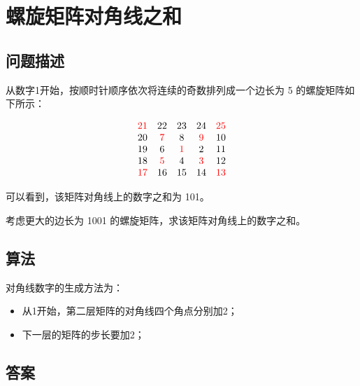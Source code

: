 \section{螺旋矩阵对角线之和}
\subsection{问题描述}
\begin{tcolorbox}

	从数字1开始，按顺时针顺序依次将连续的奇数排列成一个边长为 5 的螺旋矩阵如下所示：

	\[
		\begin{matrix}
			\textcolor{red}{21} & 22      & 23      & 24      & \textcolor{red}{25} \\
			20       & \textcolor{red}{7} & 8       & \textcolor{red}{9} & 10       \\
			19       & 6       & \textcolor{red}{1} & 2       & 11       \\
			18       & \textcolor{red}{5} & 4       & \textcolor{red}{3} & 12       \\
			\textcolor{red}{17} & 16      & 15      & 14      & \textcolor{red}{13}
		\end{matrix}
	\]

	可以看到，该矩阵对角线上的数字之和为 101。

	考虑更大的边长为 1001 的螺旋矩阵，求该矩阵对角线上的数字之和。
\end{tcolorbox}

\subsection{算法}
对角线数字的生成方法为：
\begin{itemize}
	\item 从1开始，第二层矩阵的对角线四个角点分别加2；
	\item 下一层的矩阵的步长要加2；
\end{itemize}

\subsection{答案}
